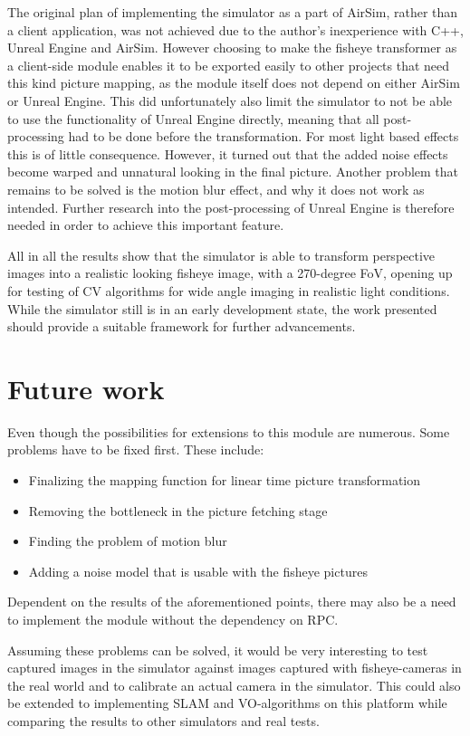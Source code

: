 The original plan of implementing the simulator as a part of AirSim, rather than a client application, was not achieved due to the author's inexperience with C++, Unreal Engine and AirSim. However choosing to make the fisheye transformer as a client-side module enables it to be exported easily to other projects that need this kind picture mapping, as the module itself does not depend on either AirSim or Unreal Engine. This did unfortunately also limit the simulator to not be able to use the functionality of Unreal Engine directly, meaning that all post-processing had to be done before the transformation. For most light based effects this is of little consequence. However, it turned out that the added noise effects become warped and unnatural looking in the final picture. Another problem that remains to be solved is the motion blur effect, and why it does not work as intended. Further research into the post-processing of Unreal Engine is therefore needed in order to achieve this important feature. 

All in all the results show that the simulator is able to transform perspective images into a realistic looking fisheye image, with a 270-degree FoV, opening up for testing of CV algorithms for wide angle imaging in realistic light conditions. While the simulator still is in an early development state, the work presented should provide a suitable framework for further advancements.

\section{Future work}

Even though the possibilities for extensions to this module are numerous. Some problems have to be fixed first. These include:
\begin{itemize}
    \item Finalizing the mapping function for linear time picture transformation
    \item Removing the bottleneck in the picture fetching stage
    \item Finding the problem of motion blur
    \item Adding a noise model that is usable with the fisheye pictures
\end{itemize}

Dependent on the results of the aforementioned points, there may also be a need to implement the module without the dependency on RPC.

Assuming these problems can be solved, it would be very interesting to test captured images in the simulator against images captured with fisheye-cameras in the real world and to calibrate an actual camera in the simulator. This could also be extended to implementing SLAM and VO-algorithms on this platform while comparing the results to other simulators and real tests.


